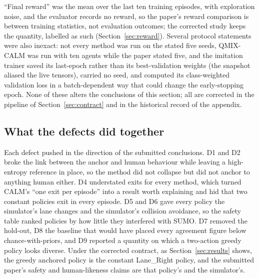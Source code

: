 ``Final reward'' was the mean over the last ten training episodes, with exploration noise, and the evaluator records no reward, so the paper's reward comparison is between training statistics, not evaluation outcomes; the corrected study keeps the quantity, labelled as such (Section~\ref{sec:reward}). Several protocol statements were also inexact: not every method was run on the stated five seeds, QMIX-CALM was run with ten agents while the paper stated five, and the imitation trainer saved its last-epoch rather than its best-validation weights (the snapshot aliased the live tensors), carried no seed, and computed its class-weighted validation loss in a batch-dependent way that could change the early-stopping epoch. None of these alters the conclusions of this section; all are corrected in the pipeline of Section~\ref{sec:contract} and in the historical record of the appendix.

\subsection{What the defects did together}
\label{sec:defects_together}

Each defect pushed in the direction of the submitted conclusions. D1 and D2 broke the link between the anchor and human behaviour while leaving a high-entropy reference in place, so the method did not collapse but did not anchor to anything human either. D4 understated exits for every method, which turned CALM's ``one exit per episode'' into a result worth explaining and hid that two constant policies exit in every episode. D5 and D6 gave every policy the simulator's lane changes and the simulator's collision avoidance, so the safety table ranked policies by how little they interfered with SUMO. D7 removed the hold-out, D8 the baseline that would have placed every agreement figure below chance-with-priors, and D9 reported a quantity on which a two-action greedy policy looks diverse. Under the corrected contract, as Section~\ref{sec:results} shows, the greedy anchored policy is the constant Lane\_Right policy, and the submitted paper's safety and human-likeness claims are that policy's and the simulator's.
